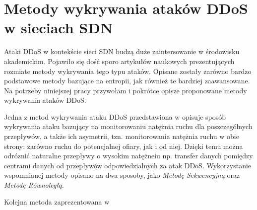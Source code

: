 \section{Metody wykrywania ataków DDoS w sieciach SDN}

Ataki DDoS w kontekście sieci SDN budzą duże zaintersowanie w środowisku
akademickim. Pojawiło się dość sporo artykułów naukowych prezentujących rozmiate
metody wykrywania tego typu ataków. Opisane zostały zarówno bardzo podstawowe
metody bazujące na entropii, jak również te bardziej zaawansowane. Na potrzeby
niniejszej pracy przywołam i pokrótce opisze proponowane metody wykrywania
ataków DDoS. 

Jedna z metod wykrywania ataku DDoS przedstawiona w \cite{ddosNYarticle} opisuje
sposób wykrywania ataku bazujący na monitorowaniu natężnia ruchu dla
poszczególnych przepływów, a także ich asymetrii, tzn. monitorowania natężnia
ruchu w obie strony: zarówno ruchu do potencjalnej ofiary, jak i od niej. Dzięki
temu można odróznić naturalne przepływy o wysokim natężneiu np. transfer danych
pomiędzy centrami danych od przepływów odpowiedzialnych za atak DDoS.
Wykorzystanie wspomnianej metody opisano na dwa sposoby, jako \textit{Metodę
Sekwencyjną} oraz \textit{Metodę Równoległą}.

Kolejna metoda zaprezentowana w \cite{ddoskoreaarticle}

